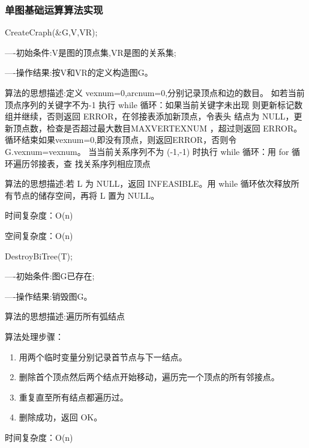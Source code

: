\documentclass[supercite]{Experimental_Report}
\theoremstyle{definition}
\begin{document}
\subsubsection{单图基础运算算法实现}
CreateCraph(\&G,V,VR);

----初始条件:V是图的顶点集,VR是图的关系集;

----操作结果:按V和VR的定义构造图G。

算法的思想描述:定义 vexnum=0,arcnum=0,分别记录顶点和边的数目。
如若当前顶点序列的关键字不为-1 执行 while 循环：如果当前关键字未出现
则更新标记数组并继续，否则返回 ERROR，在邻接表添加新顶点，令表头
结点为 NULL，更新顶点数，检查是否超过最大数目MAXVERTEXNUM ，超过则返回 ERROR。
循环结束如果vexnum=0,即没有顶点，则返回ERROR，否则令G.vexnum=vexnum。
当当前关系序列不为 (-1,-1) 时执行 while 循环：用 for 循环遍历邻接表，查
找关系序列相应顶点

算法的思想描述:若 L 为 NULL，返回 INFEASIBLE。用 while 循环依次释放所有节点的储存空间，再将 L 置为 NULL。

时间复杂度：O(n)

空间复杂度：O(n)



DestroyBiTree(T);

----初始条件:图G已存在;

----操作结果:销毁图G。

算法的思想描述:遍历所有弧结点

算法处理步骤：
\begin{enumerate}
	\renewcommand{\labelenumi}{\theenumi)}
	\item 用两个临时变量分别记录首节点与下一结点。
	\item 删除首个顶点然后两个结点开始移动，遍历完一个顶点的所有邻接点。
	\item 重复直至所有结点都遍历过。
	\item 删除成功，返回 OK。
\end{enumerate}

时间复杂度：O(n)
\end{document}
